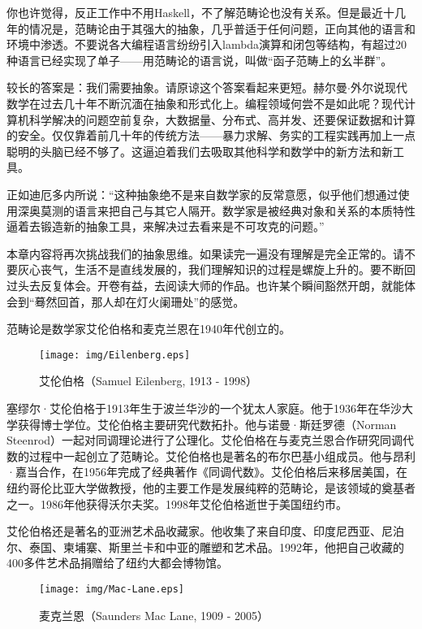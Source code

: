 \documentclass{article}
\begin{document}
你也许觉得，反正工作中不用Haskell，不了解范畴论也没有关系。但是最近十几年的情况是，范畴论由于其强大的抽象，几乎普适于任何问题，正向其他的语言和环境中渗透。不要说各大编程语言纷纷引入lambda演算和闭包等结构，有超过20种语言已经实现了单子\cite{Monad-Haskell-Wiki}——用范畴论的语言说，叫做“函子范畴上的幺半群”。

较长的答案是：我们需要抽象。请原谅这个答案看起来更短。赫尔曼$\cdot$外尔说现代数学在过去几十年不断沉湎在抽象和形式化上。编程领域何尝不是如此呢？现代计算机科学解决的问题空前复杂，大数据量、分布式、高并发、还要保证数据和计算的安全。仅仅靠着前几十年的传统方法——暴力求解、务实的工程实践再加上一点聪明的头脑已经不够了。这逼迫着我们去吸取其他科学和数学中的新方法和新工具。

正如迪厄多内所说：“这种抽象绝不是来自数学家的反常意愿，似乎他们想通过使用深奥莫测的语言来把自己与其它人隔开。数学家是被经典对象和关系的本质特性逼着去锻造新的抽象工具，来解决过去看来是不可攻克的问题。”\cite{Dieudonne1987}

本章内容将再次挑战我们的抽象思维。如果读完一遍没有理解是完全正常的。请不要灰心丧气，生活不是直线发展的，我们理解知识的过程是螺旋上升的。要不断回过头去反复体会。开卷有益，去阅读大师的作品。也许某个瞬间豁然开朗，就能体会到“蓦然回首，那人却在灯火阑珊处”的感觉。

范畴论是数学家艾伦伯格和麦克兰恩在1940年代创立的。

\begin{wrapfigure}{R}{0.3\textwidth}
 \centering
 \texttt{[image: img/Eilenberg.eps]}
 \captionsetup{labelformat=empty}
 \caption{艾伦伯格（Samuel Eilenberg, 1913 - 1998）}
 \label{fig:Eilenberg}
\end{wrapfigure}

塞缪尔·艾伦伯格于1913年生于波兰华沙的一个犹太人家庭。他于1936年在华沙大学获得博士学位。艾伦伯格主要研究代数拓扑。他与诺曼·斯廷罗德（Norman Steenrod）一起对同调理论进行了公理化。艾伦伯格在与麦克兰恩合作研究同调代数的过程中一起创立了范畴论。艾伦伯格也是著名的布尔巴基小组成员。他与昂利·嘉当合作，在1956年完成了经典著作《同调代数》。艾伦伯格后来移居美国，在纽约哥伦比亚大学做教授，他的主要工作是发展纯粹的范畴论，是该领域的奠基者之一。1986年他获得沃尔夫奖。1998年艾伦伯格逝世于美国纽约市。

艾伦伯格还是著名的亚洲艺术品收藏家。他收集了来自印度、印度尼西亚、尼泊尔、泰国、柬埔寨、斯里兰卡和中亚的雕塑和艺术品。1992年，他把自己收藏的400多件艺术品捐赠给了纽约大都会博物馆\cite{Wiki-Eilenberg}。

\begin{wrapfigure}{L}{0.3\textwidth}
 \centering
 \texttt{[image: img/Mac-Lane.eps]}
 \captionsetup{labelformat=empty}
 \caption{麦克兰恩（Saunders Mac Lane, 1909 - 2005）}
 \label{fig:Mac-Lane}
\end{wrapfigure}
\end{document}
